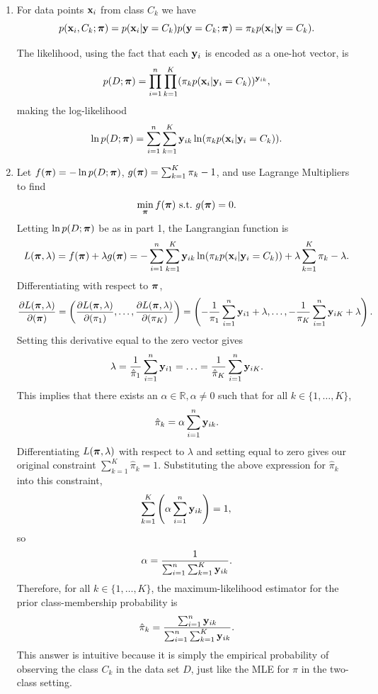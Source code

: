 \documentclass[submit]{harvardml}
\begin{document}
\begin{enumerate}
	\item For data points $\mathbf{x}_i$ from class $C_k$ we have
	$$p(\mathbf{x}_i, C_k; \boldsymbol{\pi}) = p(\mathbf{x}_i | \mathbf{y} = C_k) p(\mathbf{y} = C_k; \boldsymbol{\pi}) = \pi_k p(\mathbf{x}_i | \mathbf{y} = C_k).$$
	
	The likelihood, using the fact that each $\mathbf{y}_i$ is encoded as a one-hot vector, is
	$$p(D; \boldsymbol{\pi}) =\prod_{i=1}^n \prod_{k=1}^K (\pi_k p(\mathbf{x}_i |  \mathbf{y}_i = C_k))^{\mathbf{y}_{ik}},$$
	making the log-likelihood
	$$\ln p(D; \boldsymbol{\pi}) = \sum_{i=1}^n \sum_{k=1}^K \mathbf{y}_{ik} \ln (\pi_k p(\mathbf{x}_i |  \mathbf{y}_i = C_k)).$$
	
	\item Let $f(\boldsymbol{\pi}) = - \ln p(D; \boldsymbol{\pi})$, $g(\boldsymbol{\pi}) = \sum_{k=1}^K \pi_k - 1$, and use Lagrange Multipliers to find
	$$\min_{\boldsymbol{\pi}} f(\boldsymbol{\pi})\ \text{s.t.}\ g(\boldsymbol{\pi}) = 0.$$
	Letting $\ln p(D; \boldsymbol{\pi})$ be as in part 1, the Langrangian function is
	$$L(\boldsymbol{\pi}, \lambda) = f(\boldsymbol{\pi}) + \lambda g(\boldsymbol{\pi}) = -\sum_{i=1}^n \sum_{k=1}^K \mathbf{y}_{ik} \ln (\pi_k p(\mathbf{x}_i |  \mathbf{y}_i = C_k)) + \lambda \sum_{k=1}^K \pi_k - \lambda.$$
	Differentiating with respect to $\boldsymbol{\pi}$,
	\begin{align*}
		\frac{\partial L(\boldsymbol{\pi}, \lambda)}{\partial(\boldsymbol{\pi})}
		= \left(\frac{\partial L(\boldsymbol{\pi}, \lambda)}{\partial(\pi_1)}, \ldots, \frac{\partial L(\boldsymbol{\pi}, \lambda)}{\partial(\pi_K)}\right)
		= \left(-\frac{1}{\pi_1} \sum_{i=1}^n \mathbf{y}_{i1} + \lambda, \ldots, -\frac{1}{\pi_K} \sum_{i=1}^n \mathbf{y}_{iK} + \lambda \right).
	\end{align*}
	Setting this derivative equal to the zero vector gives
	$$\lambda = \frac{1}{\hat \pi_1} \sum_{i=1}^n \mathbf{y}_{i1} = \ldots = \frac{1}{\hat \pi_K} \sum_{i=1}^n \mathbf{y}_{iK}.$$
	This implies that there exists an $\alpha \in \mathbb{R}, \alpha \neq 0$ such that for all $k \in \{1, \ldots, K\}$,
	$$\hat \pi_k = \alpha \sum_{i=1}^n \mathbf{y}_{ik}.$$
	Differentiating $L(\boldsymbol{\pi}, \lambda)$ with respect to $\lambda$ and setting equal to zero gives our original constraint $\sum_{k=1}^K \hat \pi_k = 1$. Substituting the above expression for $\hat \pi_k$ into this constraint,
	$$\sum_{k=1}^K \left(\alpha \sum_{i=1}^n \mathbf{y}_{ik}\right) = 1,$$
	so
	$$\alpha = \frac{1}{\sum_{i=1}^n \sum_{k=1}^K \mathbf{y}_{ik}}.$$
	Therefore, for all $k \in \{1, \ldots, K\}$, the maximum-likelihood estimator for the prior class-membership probability is
	$$\hat \pi_k = \frac{\sum_{i=1}^n \mathbf{y}_{ik}}{\sum_{i=1}^n\sum_{k=1}^K \mathbf{y}_{ik}}.$$
	This answer is intuitive because it is simply the empirical probability of observing the class $C_k$ in the data set $D$, just like the MLE for $\pi$ in the two-class setting.
	

\end{enumerate}
\end{document}
